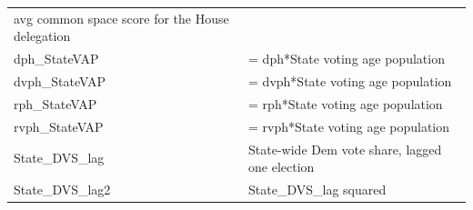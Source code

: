 \documentclass[]{book}
\begin{document}
\begin{longtable}[]{@{}ll@{}}
\begin{minipage}[t]{0.89\columnwidth}
avg common space score for the House delegation\strut
\end{minipage}\tabularnewline
\begin{minipage}[t]{0.05\columnwidth}\raggedright\strut
dph\_StateVAP\strut
\end{minipage} & \begin{minipage}[t]{0.89\columnwidth}\raggedright\strut
= dph*State voting age population\strut
\end{minipage}\tabularnewline
\begin{minipage}[t]{0.05\columnwidth}\raggedright\strut
dvph\_StateVAP\strut
\end{minipage} & \begin{minipage}[t]{0.89\columnwidth}\raggedright\strut
= dvph*State voting age population\strut
\end{minipage}\tabularnewline
\begin{minipage}[t]{0.05\columnwidth}\raggedright\strut
rph\_StateVAP\strut
\end{minipage} & \begin{minipage}[t]{0.89\columnwidth}\raggedright\strut
= rph*State voting age population\strut
\end{minipage}\tabularnewline
\begin{minipage}[t]{0.05\columnwidth}\raggedright\strut
rvph\_StateVAP\strut
\end{minipage} & \begin{minipage}[t]{0.89\columnwidth}\raggedright\strut
= rvph*State voting age population\strut
\end{minipage}\tabularnewline
\begin{minipage}[t]{0.05\columnwidth}\raggedright\strut
State\_DVS\_lag\strut
\end{minipage} & \begin{minipage}[t]{0.89\columnwidth}\raggedright\strut
State-wide Dem vote share, lagged one election\strut
\end{minipage}\tabularnewline
\begin{minipage}[t]{0.05\columnwidth}\raggedright\strut
State\_DVS\_lag2\strut
\end{minipage} & \begin{minipage}[t]{0.89\columnwidth}\raggedright\strut
State\_DVS\_lag squared\strut
\end{minipage}\tabularnewline
\bottomrule
\end{longtable}
\end{document}
